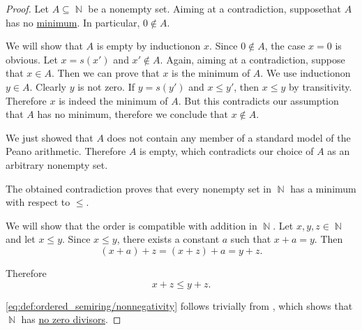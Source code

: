 \begin{proof}
   Let \( A \subseteq \BbbN \) be a nonempty set. Aiming at a contradiction, suppose\LEM that \( A \) has no \hyperref[def:preordered_set/largest_smallest_element]{minimum}. In particular, \( 0 \not\in A \).

  We will show that \( A \) is empty by induction\IND on \( x \). Since \( 0 \not\in A \), the case \( x = 0 \) is obvious. Let \( x = s(x') \) and \( x' \not\in A \). Again, aiming at a contradiction, suppose that \( x \in A \). Then we can prove that \( x \) is the minimum of \( A \). We use induction\LEM on \( y \in A \). Clearly \( y \) is not zero. If \( y = s(y') \) and \( x \leq y' \), then \( x \leq y \) by transitivity. Therefore \( x \) is indeed the minimum of \( A \). But this contradicts our assumption that \( A \) has no minimum, therefore we conclude that \( x \not\in A \).

  We just showed that \( A \) does not contain any member of a standard model of the Peano arithmetic. Therefore \( A \) is empty, which contradicts our choice of \( A \) as an arbitrary nonempty set.

  The obtained contradiction proves that every nonempty set in \( \BbbN \) has a minimum with respect to \( \leq \).

   We will show that the order is compatible with addition in \( \BbbN \). Let \( x, y, z \in \BbbN \) and let \( x \leq y \). Since \( x \leq y \), there exists a constant \( a \) such that \( x + a = y \). Then
  \begin{equation*}
    (x + a) + z = (x + z) + a = y + z.
  \end{equation*}

  Therefore
  \begin{equation*}
    x + z \leq y + z.
  \end{equation*}

   \eqref{eq:def:ordered_semiring/nonnegativity} follows trivially from , which shows that \( \BbbN \) has \hyperref[def:semiring/no_zero_divisor]{no zero divisors}.
\end{proof}
